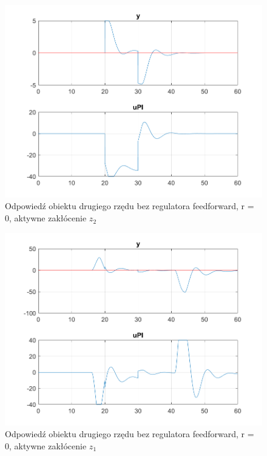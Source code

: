\begin{figure}[h!]
	\centering
	\includegraphics[scale = 0.8]{fig/bezFeedforward/fig1_2_0_z2.png}
	\caption		
	{Odpowiedź obiektu drugiego rzędu bez regulatora feedforward, r = 0, aktywne zakłócenie $z_2$}
	\label{wykres_6}
\end{figure}

\begin{figure}[h!]
	\centering
	\includegraphics[scale = 0.8]{fig/bezFeedforward/fig1_2_0_z1z2.png}
	\caption		
	{Odpowiedź obiektu drugiego rzędu bez regulatora feedforward, r = 0, aktywne zakłócenie $z_1$}
	\label{wykres_7}
\end{figure} 
